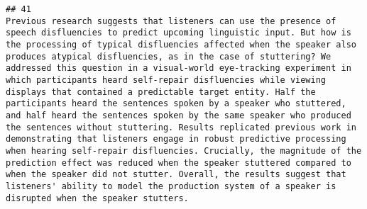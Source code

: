 \documentclass[
  english,
  man]{apa6}
\begin{document}
\begin{verbatim}
## 41                                                                                                                                                                                                                                                                                                                                                                                                                                                                                                                                                                                                                                                                                                                                                                                                                                                                                                                                                                                                                                                                                                                                                                                                                                                                                                                                                                                                                                                                                                                                                                                Previous research suggests that listeners can use the presence of speech disfluencies to predict upcoming linguistic input. But how is the processing of typical disfluencies affected when the speaker also produces atypical disfluencies, as in the case of stuttering? We addressed this question in a visual-world eye-tracking experiment in which participants heard self-repair disfluencies while viewing displays that contained a predictable target entity. Half the participants heard the sentences spoken by a speaker who stuttered, and half heard the sentences spoken by the same speaker who produced the sentences without stuttering. Results replicated previous work in demonstrating that listeners engage in robust predictive processing when hearing self-repair disfluencies. Crucially, the magnitude of the prediction effect was reduced when the speaker stuttered compared to when the speaker did not stutter. Overall, the results suggest that listeners' ability to model the production system of a speaker is disrupted when the speaker stutters.

\end{verbatim}
\end{document}
